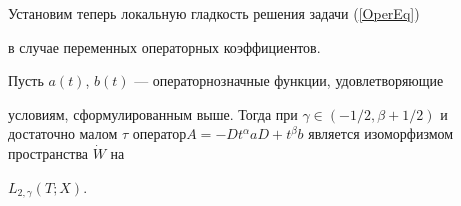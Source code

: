 Установим теперь локальную гладкость решения задачи (\ref{OperEq})


в случае переменных операторных коэффициентов.








\begin{thms}\label{LocSolv}


Пусть $a(t)$, $b(t)$ --- операторнозначные функции, удовлетворяющие


условиям, сформулированным выше. Тогда при $\gamma \in (-1/2,


\beta+1/2)$ и достаточно малом $\tau$ оператор\linebreak $A=-Dt^\alpha a D +


t^\beta b$ является изоморфизмом пространства $\Dot{W}$ на


$L_{2,\gamma}(T;X)$.


\end{thms}








